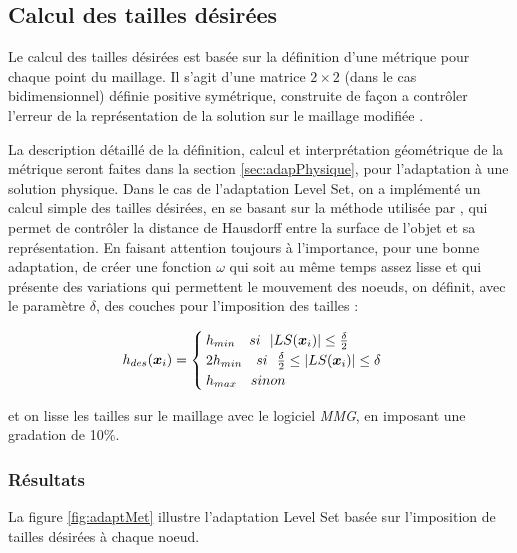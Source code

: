 \subsection{Calcul des tailles désirées}

\indent Le calcul des tailles désirées est basée sur la définition d'une métrique pour chaque point du maillage. Il s'agit d'une matrice \(2 \times 2\) (dans le cas bidimensionnel) définie positive symétrique, construite de façon a contrôler l'erreur de la représentation de la solution sur le maillage modifiée \cite{leo}.


\indent La description détaillé de la définition, calcul et interprétation géométrique de la métrique seront faites dans la section \ref{sec:adapPhysique}, pour l'adaptation à une solution physique. Dans le cas de l'adaptation Level Set, on a implémenté un calcul simple des tailles désirées, en se basant sur la méthode utilisée par \cite{ducrot}, qui permet de contrôler la distance de Hausdorff entre la surface de l'objet et sa représentation. En faisant attention toujours à l'importance, pour une bonne adaptation,  de créer une fonction \(\omega\) qui soit au même temps assez lisse et qui présente des variations qui permettent le mouvement des noeuds, on définit, avec le paramètre \(\delta\), des couches pour l'imposition des tailles : 

\begin{equation*}
	h_{des} (\boldsymbol{x}_i) =
	\begin{cases}
		h_{min} \ \ \ si \ \ |LS(\boldsymbol{x}_i)| \leq \frac{\delta}{2} \\
		2h_{min} \ \ \ si \ \ \frac{\delta}{2} \leq |LS(\boldsymbol{x}_i)|  \leq \delta \\
		h_{max} \ \ \ sinon
	\end{cases}
\end{equation*}

\noindent et on lisse les tailles sur le maillage avec le logiciel \emph{MMG}, en imposant une gradation de 10\%.

\subsubsection{Résultats}

\indent La figure \ref{fig:adaptMet} illustre l'adaptation Level Set basée sur l'imposition de tailles désirées à chaque noeud.

